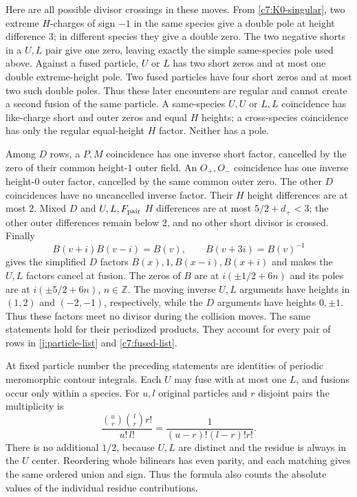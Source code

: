 Here are all possible divisor crossings in these moves.  From
\eqref{c7:K0-singular}, two extreme $H$-charges of sign $-1$ in the same
species give a double pole at height difference $3$; in different species
they give a double zero.  The two negative shorts in a $U,L$ pair give one
zero, leaving exactly the simple same-species pole used above.  Against a
fused particle, $U$ or $L$ has two short zeros and at most one double
extreme-height pole.  Two fused particles have four short zeros and at most
two such double poles.  Thus these later encounters are regular and cannot
create a second fusion of the same particle.  A same-species $U,U$ or $L,L$
coincidence has like-charge short and outer zeros and equal $H$ heights; a
cross-species coincidence has only the regular equal-height $H$ factor.
Neither has a pole.

Among $D$ rows, a $P,M$ coincidence has one inverse short factor, cancelled
by the zero of their common height-$1$ outer field.  An $O_+,O_-$
coincidence has one inverse height-$0$ outer factor, cancelled by the same
common outer zero.  The other $D$ coincidences have no uncancelled inverse
factor.  Their $H$ height differences are at most $2$.  Mixed $D$ and
$U,L,F_{\rm pair}$ $H$ differences are at most $5/2+d_+<3$; the other
outer differences remain below $2$, and no other short divisor is crossed.
Finally
\begin{equation}\label{c7:B-recurrences}
B(v+i)B(v-i)=B(v),\qquad B(v+3i)=B(v)^{-1}
\end{equation}
gives the simplified $D$ factors $B(x),1,B(x-i),B(x+i)$ and makes the $U,L$
factors cancel at fusion.  The zeros of $B$ are at $i(\pm1/2+6n)$ and its
poles are at $i(\pm5/2+6n)$, $n\in\mathbb Z$.  The moving inverse $U,L$
arguments have heights in $(1,2)$ and $(-2,-1)$, respectively, while the
$D$ arguments have heights $0,\pm1$.  Thus these factors meet no divisor
during the collision moves.  The same statements hold for their periodized
products.  They account for every pair of rows in
\eqref{j:particle-list} and \eqref{c7:fused-list}.

At fixed particle number the preceding statements are identities of
periodic meromorphic contour integrals.  Each $U$ may fuse with at most one
$L$, and fusions occur only within a species.  For $u,l$ original particles
and $r$ disjoint pairs the multiplicity is
\begin{equation}\label{c7:fusion-factorial}
\frac{\binom ur\binom lr r!}{u!\,l!}
=\frac1{(u-r)!(l-r)!r!}.
\end{equation}
There is no additional $1/2$, because $U,L$ are distinct and the residue is
always in the $U$ center.  Reordering whole bilinears has even parity, and
each matching gives the same ordered union and sign.  Thus the formula also
counts the absolute values of the individual residue contributions.

